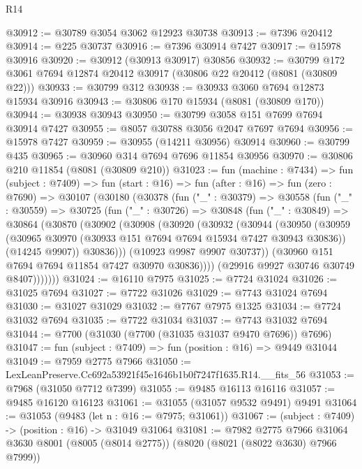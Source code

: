 \begin{lexlean}{R14}
\begin{coremodule}
@30912 := @30789 @3054 @3062 @12923 @30738
@30913 := @7396 @20412
@30914 := @225 @30737
@30916 := @7396 @30914 @7427
@30917 := @15978 @30916
@30920 := @30912 (@30913 @30917) @30856
@30932 := @30799 @172 @3061 @7694 @12874 @20412 @30917 (@30806 @22 @20412 (@8081 (@30809 @22)))
@30933 := @30799 @312
@30938 := @30933 @3060 @7694 @12873 @15934 @30916
@30943 := @30806 @170 @15934 (@8081 (@30809 @170))
@30944 := @30938 @30943
@30950 := @30799 @3058 @151 @7699 @7694 @30914 @7427
@30955 := @8057 @30788 @3056 @2047 @7697 @7694
@30956 := @15978 @7427
@30959 := @30955 (@14211 @30956) @30914
@30960 := @30799 @435
@30965 := @30960 @314 @7694 @7696 @11854 @30956
@30970 := @30806 @210 @11854 (@8081 (@30809 @210))
@31023 := fun (machine : @7434) =>
  fun (subject : @7409) =>
  fun (start : @16) =>
  fun (after : @16) =>
  fun (zero : @7690) =>
  @30107
    (@30180
      (@30378
        (fun ("_" : @30379) =>
        @30558
          (fun ("_" : @30559) =>
          @30725
            (fun ("_" : @30726) =>
            @30848
              (fun ("_" : @30849) =>
              @30864
                (@30870
                  (@30902
                    (@30908
                      (@30920
                        (@30932
                          (@30944
                            (@30950
                              (@30959
                                (@30965 @30970 (@30933 @151 @7694 @7694 @15934 @7427 @30943 @30836))
                                (@14245 @9907))
                              @30836)))
                        (@10923 @9987 @9907 @30737))
                      (@30960 @151 @7694 @7694 @11854 @7427 @30970 @30836))))
                (@29916 @9927 @30746 @30749 @8407)))))))
@31024 := @16110 @7975
@31025 := @7724 @31024
@31026 := @31025 @7694
@31027 := @7722 @31026
@31029 := @7743 @31024 @7694
@31030 := @31027 @31029
@31032 := @7767 @7975 @1325
@31034 := @7724 @31032 @7694
@31035 := @7722 @31034
@31037 := @7743 @31032 @7694
@31044 := @7700 (@31030 (@7700 (@31035 @31037 @9470 @7696)) @7696)
@31047 := fun (subject : @7409) => fun (position : @16) => @9449 @31044
@31049 := @7959 @2775 @7966
@31050 := LexLeanPreserve.Cc692a53921f45e1646b1b0f7247f1635.R14.__fits_56
@31053 := @7968 (@31050 @7712 @7399)
@31055 := @9485 @16113 @16116
@31057 := @9485 @16120 @16123
@31061 := @31055 (@31057 @9532 @9491) @9491
@31064 := @31053 (@9483 (let n : @16 := @7975; @31061))
@31067 := (subject : @7409) -> (position : @16) -> @31049 @31064
@31081 := @7982
    @2775
    @7966
    @31064
    @3630
    @8001
    (@8005 (@8014 @2775))
    (@8020 (@8021 (@8022 @3630) @7966 @7999))

\end{coremodule}
\end{lexlean}
